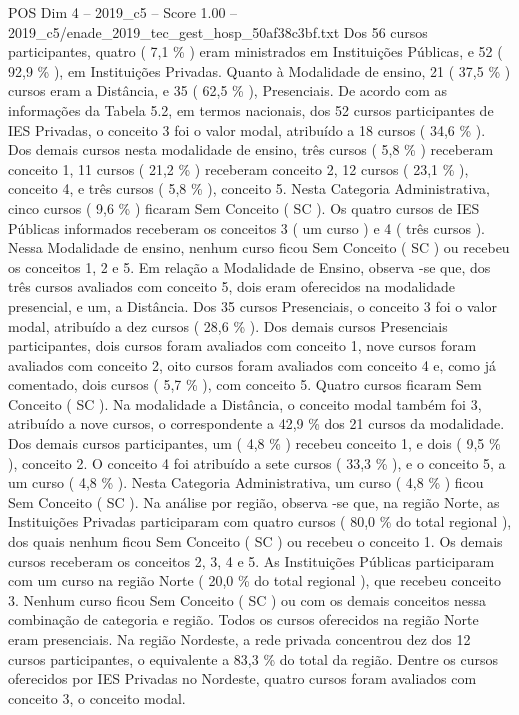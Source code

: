 \begin{textsample}{POS Dim 4 – 2019\_c5 – Score 1.00 – 2019\_c5/enade\_2019\_tec\_gest\_hosp\_50af38c3bf.txt}
Dos 56 cursos participantes, quatro ( 7,1 \% ) eram ministrados em Instituições Públicas, e 52 ( 92,9 \% ), em Instituições Privadas.
Quanto à Modalidade de ensino, 21 ( 37,5 \% ) cursos eram a Distância, e 35 ( 62,5 \% ), Presenciais.
De acordo com as informações da Tabela 5.2, em termos nacionais, dos 52 cursos participantes de IES Privadas, o conceito 3 foi o valor modal, atribuído a 18 cursos ( 34,6 \% ).
Dos demais cursos nesta modalidade de ensino, três cursos ( 5,8 \% ) receberam conceito 1, 11 cursos ( 21,2 \% ) receberam conceito 2, 12 cursos ( 23,1 \% ), conceito 4, e três cursos ( 5,8 \% ), conceito 5.
Nesta Categoria Administrativa, cinco cursos ( 9,6 \% ) ficaram Sem Conceito ( SC ).
Os quatro cursos de IES Públicas informados receberam os conceitos 3 ( um curso ) e 4 ( três cursos ).
Nessa Modalidade de ensino, nenhum curso ficou Sem Conceito ( SC ) ou recebeu os conceitos 1, 2 e 5.
Em relação a Modalidade de Ensino, observa -se que, dos três cursos avaliados com conceito 5, dois eram oferecidos na modalidade presencial, e um, a Distância.
Dos 35 cursos Presenciais, o conceito 3 foi o valor modal, atribuído a dez cursos ( 28,6 \% ).
Dos demais cursos Presenciais participantes, dois cursos foram avaliados com conceito 1, nove cursos foram avaliados com conceito 2, oito cursos foram avaliados com conceito 4 e, como já comentado, dois cursos ( 5,7 \% ), com conceito 5.
Quatro cursos ficaram Sem Conceito ( SC ).
Na modalidade a Distância, o conceito modal também foi 3, atribuído a nove cursos, o correspondente a 42,9 \% dos 21 cursos da modalidade.
Dos demais cursos participantes, um ( 4,8 \% ) recebeu conceito 1, e dois ( 9,5 \% ), conceito 2.
O conceito 4 foi atribuído a sete cursos ( 33,3 \% ), e o conceito 5, a um curso ( 4,8 \% ).
Nesta Categoria Administrativa, um curso ( 4,8 \% ) ficou Sem Conceito ( SC ).
Na análise por região, observa -se que, na região Norte, as Instituições Privadas participaram com quatro cursos ( 80,0 \% do total regional ), dos quais nenhum ficou Sem Conceito ( SC ) ou recebeu o conceito 1.
Os demais cursos receberam os conceitos 2, 3, 4 e 5.
As Instituições Públicas participaram com um curso na região Norte ( 20,0 \% do total regional ), que recebeu conceito 3.
Nenhum curso ficou Sem Conceito ( SC ) ou com os demais conceitos nessa combinação de categoria e região.
Todos os cursos oferecidos na região Norte eram presenciais.
Na região Nordeste, a rede privada concentrou dez dos 12 cursos participantes, o equivalente a 83,3 \% do total da região.
Dentre os cursos oferecidos por IES Privadas no Nordeste, quatro cursos foram avaliados com conceito 3, o conceito modal.

\end{textsample}
